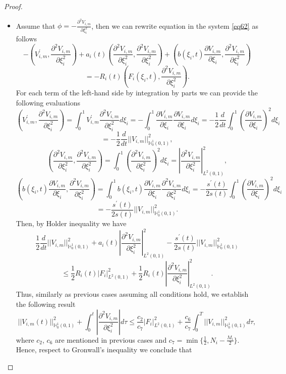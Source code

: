 \documentclass[10pt,a4paper]{amsart}
\begin{document}
\begin{proof}
\begin{itemize}
        \item[Case 3.] Assume that $\phi=-\frac{\partial^2 V_{i,m}}{\partial\xi_i^2}$, then we can rewrite equation in the system \eqref{eq62} as follows
        $$-\left(V_{i,m}^{\prime},\frac{\partial^2 V_{i,m}}{\partial\xi_i^2}\right)+a_i(t)\left(\frac{\partial^2 V_{i,m}}{\partial \xi_i^2},\frac{\partial^2 V_{i,m}}{\partial\xi_i^2}\right)+\left(b(\xi_i,t)\frac{\partial V_{i,m}}{\partial \xi_i},\frac{\partial^2 V_{i,m}}{\partial\xi_i^2}\right)$$
        $$=-R_i(t)\left(F_i(\xi_i,t),\frac{\partial^2 V_{i,m}}{\partial\xi_i^2}\right).$$
        For each term of the left-hand side by integration by parts we can provide the following evaluations
        $$\left(V_{i,m}^{\prime},\frac{\partial^2 V_{i,m}}{\partial\xi_i^2}\right)=\int_0^1 V_{i,m}^{\prime}\frac{\partial^2 V_{i,m}}{\partial\xi_i^2}d\xi_i=-\int_0^1\frac{\partial V_{i,m}^{\prime}}{\partial\xi_i}\frac{\partial V_{i,m}}{\partial\xi_i}d\xi_i=-\frac{1}{2}\frac{d}{dt}\int_0^1\left(\frac{\partial V_{i,m}}{\partial\xi_i}\right)^2d\xi_i$$
        $$=-\frac{1}{2}\frac{d}{dt}||V_{i,m}||_{\mathbb{H}_0^1(0,1)}^2,$$
        $$\left(\frac{\partial^2 V_{i,m}}{\partial \xi_i^2},\frac{\partial^2 V_{i,m}}{\partial\xi_i^2}\right)=\int_0^1\left(\frac{\partial^2V_{i,m}}{\partial\xi_i^2}\right)^2d\xi_i=\left|\frac{\partial^2V_{i,m}}{\partial\xi_i^2}\right|_{L^2(0,1)}^2,$$
        $$\left(b(\xi_i,t)\frac{\partial V_{i,m}}{\partial \xi_i},\frac{\partial^2 V_{i,m}}{\partial\xi_i^2}\right)=\int_0^1 b(\xi_i,t)\frac{\partial V_{i,m}}{\partial\xi_i}\frac{\partial^2 V_{i,m}}{\partial\xi_i^2}d\xi_i=-\frac{s^{\prime}(t)}{2s(t)}\int_0^1\left(\frac{\partial V_{i,m}}{\partial\xi_i}\right)^2d\xi_i$$
        $$=-\frac{s^{\prime}(t)}{2s(t)}||V_{i,m}||_{\mathbb{H}_0^1(0,1)}^2.$$
        Then, by Holder inequality we have
        $$\frac{1}{2}\frac{d}{dt}||V_{i,m}||_{\mathbb{H}_0^1(0,1)}^2+a_i(t)\left|\frac{\partial^2V_{i,m}}{\partial\xi_i^2}\right|_{L^2(0,1)}^2-\frac{s^{\prime}(t)}{2s(t)}||V_{i,m}||_{\mathbb{H}_0^1(0,1)}^2$$
        $$\leq\frac{1}{2}R_i(t)|F_i|_{L^2(0,1)}^2+\frac{1}{2}R_i(t)\left|\frac{\partial^2V_{i,m}}{\partial\xi_i^2}\right|_{L^2(0,1)}^2.$$
        Thus, similarly as previous cases assuming all conditions hold, we establish the following result
        $$||V_{i,m}(t)||_{\mathbb{H}_0^1(0,1)}^2+\int_0^t\left|\frac{\partial^2V_{i,m}}{\partial\xi_i^2}\right|d\tau\leq \frac{c_2}{c_7}|F_i|_{L^2(0,1)}^2+\frac{c_6}{c_7}\int_0^T||V_{i,m}||_{\mathbb{H}_0^1(0,1)}^2d\tau,$$
        where $c_2$, $c_6$ are mentioned in previous cases and $c_7=\min\{\frac{1}{2},N_i-\frac{M_i}{2}\}$. Hence, respect to Gronwall's inequality we conclude that

\end{itemize}
\end{proof}
\end{document}
